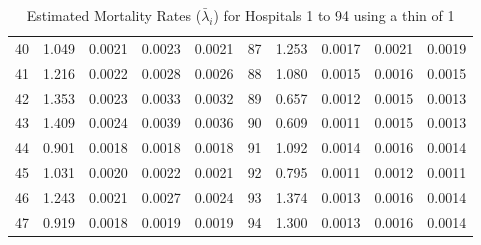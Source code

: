 \documentclass[12pt, leqno]{article}
\begin{document}
\begin{table}[ht]
{\begin{tabular}{r|r|r|r|r|r|r|r|r|r}
  40 & 1.049 & 0.0021 & 0.0023 & 0.0021 & 87 & 1.253 & 0.0017 & 0.0021 & 0.0019 \\ 
  41 & 1.216 & 0.0022 & 0.0028 & 0.0026 & 88 & 1.080 & 0.0015 & 0.0016 & 0.0015 \\ 
  42 & 1.353 & 0.0023 & 0.0033 & 0.0032 & 89 & 0.657 & 0.0012 & 0.0015 & 0.0013 \\ 
  43 & 1.409 & 0.0024 & 0.0039 & 0.0036 & 90 & 0.609 & 0.0011 & 0.0015 & 0.0013 \\ 
  44 & 0.901 & 0.0018 & 0.0018 & 0.0018 & 91 & 1.092 & 0.0014 & 0.0016 & 0.0014 \\ 
  45 & 1.031 & 0.0020 & 0.0022 & 0.0021 & 92 & 0.795 & 0.0011 & 0.0012 & 0.0011 \\ 
  46 & 1.243 & 0.0021 & 0.0027 & 0.0024 & 93 & 1.374 & 0.0013 & 0.0016 & 0.0014 \\ 
  47 & 0.919 & 0.0018 & 0.0019 & 0.0019 & 94 & 1.300 & 0.0013 & 0.0016 & 0.0014 \\ 
   \hline
   \hline
\end{tabular}
}

\caption{Estimated Mortality Rates ($\bar{\lambda}_i$) for Hospitals 1
  to 94 using a thin of 1} 
\label{mean1}
\end{table}
\end{document}
